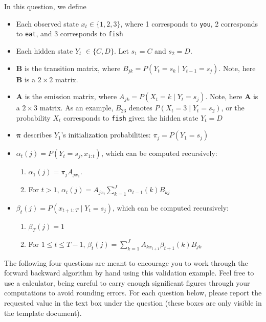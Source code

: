 \documentclass[11pt,addpoints,answers]{exam}
\begin{document}
\begin{questions}
\clearpage
In this question, we define
\begin{itemize}
    \item Each observed state $x_t \in \{1,2,3\}$, where 1 corresponds to \texttt{you}, 2 corresponds to \texttt{eat}, and 3 corresponds to \texttt{fish}
    \item Each hidden state $Y_t$ $\in \{C,D\}$. Let $s_1 = C$ and $s_2 = D$.
    \item $\mathbf{B}$ is the transition matrix, where $B_{jk} = P(Y_{t} = s_{k} \mid Y_{t-1} = s_{j})$. Note, here $\mathbf{B}$ is a $2 \times 2$ matrix. 
    \item $\mathbf{A}$ is the emission matrix, where $A_{jk} = P(X_{t} = k \mid Y_{t} = s_{j})$. Note, here $\mathbf{A}$ is a $2 \times 3$ matrix. As an example, $B_{23}$ denotes $P(X_{t} = 3 \mid Y_{t} = s_{2})$, or the probability $X_{t}$ corresponds to \texttt{fish} given the hidden state $Y_t = D$
    \item $\boldsymbol{\pi}$ describes $Y_1$'s initialization probabilities: $\pi_j = P(Y_1 = s_j)$
    \vspace{1 cm}
    \item $\alpha_t(j) = P(Y_t = s_j, x_{1:t})$, which can be computed recursively:
        \begin{enumerate}
            \item $\alpha_1(j)=\pi_jA_{jx_1}$. 
            \item For $t > 1$, $\alpha_{t}(j)=A_{jx_{t}}\sum_{k=1}^{J}\alpha_{t-1}(k)B_{kj}$ 
        \end{enumerate}
    \item  $\beta_t(j) = P(x_{t+1:T} \mid Y_t = s_j)$, which can be computed recursively:
        \begin{enumerate}
            \item $\beta_T(j) = 1$ 
            \item  For $1\leq t \leq T-1$, $\beta_t(j) = \sum_{k=1}^{J}A_{kx_{t+1}}\beta_{t+1}(k)B_{jk}$ 
        \end{enumerate}
\end{itemize} 
\vspace{0.5cm}

The following four questions are meant to encourage you to work through the forward backward algorithm by hand using this validation example. Feel free to use a calculator, being careful to carry enough significant figures through your computations to avoid rounding errors. For each question below, please report the requested value in the text box under the question (these boxes are only visible in the template document). 


\end{questions}
\end{document}
